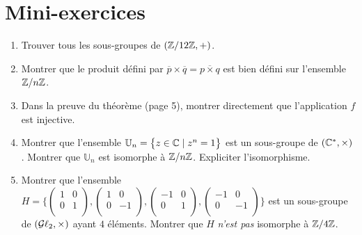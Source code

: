 \section{Mini-exercices}

\begin{frame}

\begin{miniexercice}
\begin{enumerate}
  \item Trouver tous les sous-groupes de $(\mathbb{Z}/12\mathbb{Z},+)$.

  \item Montrer que le produit défini par $\overline p \times \overline q = \overline{p\times q}$
est bien défini sur l'ensemble $\mathbb{Z}/n\mathbb{Z}$.

  \item Dans la preuve du théorème (page 5), montrer directement que l'application
$f$ est injective.

  \item Montrer que l'ensemble $\mathbb{U}_n = \big\{ z \in \mathbb{C} \mid z^n = 1 \big\}$ est un sous-groupe 
  de $(\mathbb{C}^*,\times)$. Montrer que $\mathbb{U}_n$ est isomorphe à $\mathbb{Z}/n\mathbb{Z}$. Expliciter l'isomorphisme.

  \item Montrer que l'ensemble 
$H = \big\{
\left(\begin{smallmatrix} 1 & 0 \\ 0 & 1 \\ \end{smallmatrix}\right),
\left(\begin{smallmatrix} 1 & 0 \\ 0 & -1 \\ \end{smallmatrix}\right),
\left(\begin{smallmatrix} -1 & 0 \\ 0 & 1 \\ \end{smallmatrix}\right),
\left(\begin{smallmatrix} -1 & 0 \\ 0 & -1 \\ \end{smallmatrix}\right)
 \big\}$ 
est un sous-groupe de $(\mathcal{G}\ell_2,\times)$
ayant $4$ éléments. Montrer que $H$ \emph{n'est pas} isomorphe à $\mathbb{Z}/4\mathbb{Z}$.
\end{enumerate}

\end{miniexercice}
\end{frame}




